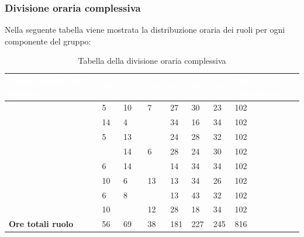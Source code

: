 \subsubsection{Divisione oraria complessiva} 
Nella seguente tabella viene mostrata la distribuzione oraria dei ruoli per ogni componente del gruppo:
{
	\renewcommand{\arraystretch}{2}

	\begin{longtable}{ C{5cm} C{1cm} C{1cm} C{1cm} C{1cm} C{1cm} C{1cm} C{3cm}}
	\caption{Tabella della divisione oraria complessiva}\\
		\textcolor{white}{\textbf{Nome membro del gruppo}} & 
		\textcolor{white}{\textbf{RE}} & 
		\textcolor{white}{\textbf{AM}} & 
		\textcolor{white}{\textbf{AN}} & 
		\textcolor{white}{\textbf{PT}} & 
		\textcolor{white}{\textbf{PR}} & 
		\textcolor{white}{\textbf{VE}} & 
		\textcolor{white}{\textbf{Ore complessive}}\\	
		\endhead
        
        \MC{} & 5 & 10 & 7 & 27 & 30 & 23 & 102 \\
        \LD{} & 14 & 4 & & 34 & 16 & 34 & 102\\
        \CE{} & 5 & 13 & & 24 & 28 & 32 & 102 \\
        \SE{} & & 14 & 6 & 28 & 24 & 30 & 102\\
        \PF{} & 6 & 14 & & 14 & 34 & 34 & 102\\
        \DF{} & 10 & 6 & 13 & 13 & 34 & 26 & 102 \\
        \BR{} & 6 & 8 & & 13 & 43 & 32 & 102 \\
        \AT{} & 10 & & 12 & 28 & 18 & 34 & 102 \\
        \textbf{Ore totali ruolo} & 56 & 69 & 38 & 181 & 227 & 245 &  816 \\

	\end{longtable}

}
